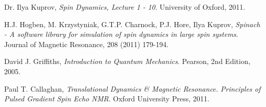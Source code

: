 \documentclass[11.5pt,a4paper]{article}
\begin{document}
\FloatBarrier
\begin{thebibliography}{9}
  Dr. Ilya Kuprov,
  \emph{Spin Dynamics, Lecture 1 - 10}.
  University of Oxford,
  2011.

  H.J. Hogben, M. Krzystyniak, G.T.P. Charnock, P.J. Hore, Ilya Kuprov,
  \emph{Spinach - A software library for simulation of spin dynamics in large spin systems}.
  Journal of Magnetic Resonance,
  208 (2011) 179-194.

  David J. Griffiths,
  \emph{Introduction to Quantum Mechanics}.
  Pearson, 
  2nd Edition, 
  2005.

  Paul T. Callaghan,
  \emph{Translational Dynamics \& Magnetic Resonance. Principles of Pulsed Gradient Spin Echo NMR}.
  Oxford University Press,
  2011.

\end{thebibliography}
\end{document}
